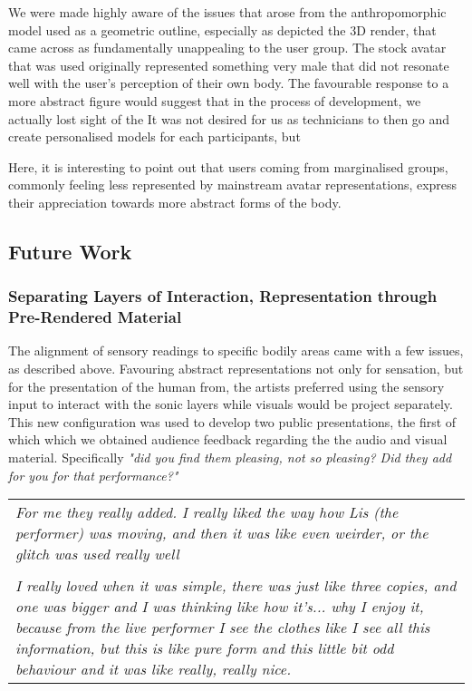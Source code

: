 We were made highly aware of the issues that arose from the anthropomorphic model used as a geometric outline, especially as depicted the 3D render, that came across as fundamentally unappealing to the user group. The stock avatar that was used originally represented something very male that did not resonate well with the user's perception of their own body.  
The favourable response to a more abstract figure would suggest that in the process of development, we actually lost sight of the 
It was not desired for us as technicians to then go and create personalised models for each participants, but 

Here, it is interesting to point out that users coming from marginalised groups, commonly feeling less represented by mainstream avatar representations, express their appreciation towards more abstract forms of the body.
\cite{niehaus_making_2021}

\subsection{Future Work}

\subsubsection{Separating Layers of Interaction, Representation through Pre-Rendered Material}

The alignment of sensory readings to specific bodily areas came with a few issues, as described above. Favouring abstract representations not only for sensation, but for the presentation of the human from, the artists preferred using the sensory input to interact with the sonic layers while visuals would be project separately. This new configuration was used to develop two public presentations, the first of which which we obtained audience feedback regarding the the audio and visual material. Specifically \textit{"did you find them pleasing, not so pleasing? Did they add for you for that performance?"}

\begin{center}
\begin{tabular}{ p{13cm}} 
\textit{For me they really added. I really liked the way how Lis (the performer) was moving, and then it was like even weirder, or the glitch was used really well} \\
\\
\textit{I really loved when it was simple, there was just like three copies, and one was bigger and I was thinking like how it's... why I enjoy it, because from the live performer I see the clothes like I see all this information, but this is like pure form and this little bit odd behaviour and it was like really, really nice.}
\end{tabular}
\end{center}

